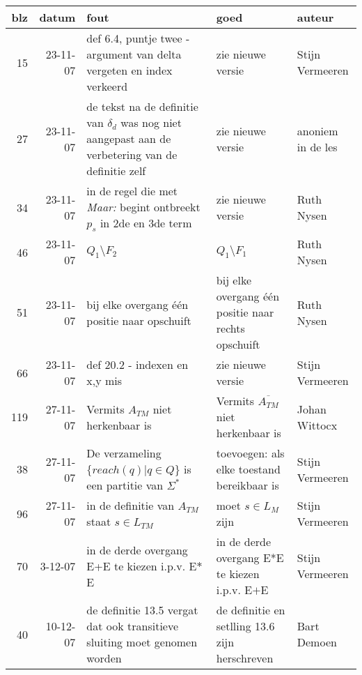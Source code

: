 \documentclass[11pt]{fund}
\begin{document}
\begin{tabular}{|r|r|p{6cm}|p{6cm}|p{2cm}|}
\hline
blz & datum    & fout & goed  & auteur \\ \hline
\hline

15 &
23-11-07 &
def 6.4, puntje twee - argument van delta vergeten en index verkeerd &
zie nieuwe versie &
Stijn Vermeeren \\ \hline

27 &
23-11-07 &
de tekst na de definitie van $\delta_d$ was nog niet aangepast aan de
verbetering van de definitie zelf &
zie nieuwe versie &
anoniem in de les \\ \hline

34 &
23-11-07 &
in de regel die met {\em Maar:} begint ontbreekt $p_s$ in 2de en 3de term &
zie nieuwe versie &
Ruth Nysen \\ \hline

46 &
23-11-07 &
$Q_1 \setminus F_2$ &
$Q_1 \setminus F_1$ &
Ruth Nysen \\ \hline

51 &
23-11-07 &
bij elke overgang \'{e}\'{e}n positie naar opschuift &
bij elke overgang \'{e}\'{e}n positie naar rechts opschuift &
Ruth Nysen \\ \hline

66 &
23-11-07 &
def 20.2 - indexen en x,y mis&
zie nieuwe versie &
Stijn Vermeeren \\ \hline

119 &
27-11-07 &
Vermits $A_{TM}$ niet herkenbaar is &
Vermits $\overline{A_{TM}}$ niet herkenbaar is &
Johan Wittocx \\ \hline

38 &
27-11-07 &
De verzameling $\{reach(q) | q \in Q\}$ is een partitie van $\Sigma^*$ &
toevoegen: als elke toestand bereikbaar is &
Stijn Vermeeren \\ \hline

96 &
27-11-07 &
in de definitie van $A_{TM}$ staat $s \in L_{TM}$ &
moet $s \in L_M$ zijn &
Stijn Vermeeren \\ \hline

70 &
3-12-07 &
in de derde overgang E+E te kiezen i.p.v. E$*$E &
in de derde overgang E*E te kiezen i.p.v. E$+$E &
Stijn Vermeeren \\ \hline


40 &
10-12-07 &
de definitie 13.5 vergat dat ook transitieve sluiting moet genomen worden &
de definitie en setlling 13.6 zijn herschreven &
Bart Demoen \\ \hline


\end{tabular}
\end{document}
